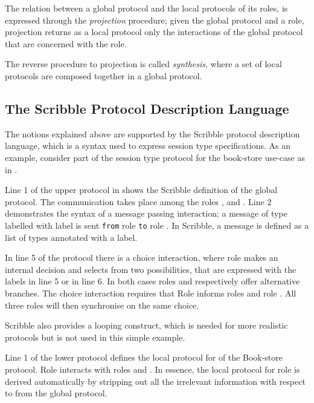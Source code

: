 The relation between a global protocol and the
local protocols of its roles, is expressed
through the {\em projection} procedure;
given the global protocol and a role, projection
returns as a local protocol only the
interactions of the global protocol that are concerned with
the role.

The reverse procedure to projection is called {\em synthesis},
where a set of local protocols are composed together in a global
protocol.


\subsection{The Scribble Protocol Description Language}
\label{sec:scribble}
The notions explained above are supported by the
Scribble protocol description language,
which is a syntax used to express session type specifications.
As an example,
consider part of the session type protocol for the book-store
use-case as in . 




Line 1 of the upper protocol in  shows the
Scribble definition of the global protocol. 
The communication takes place
among the roles \BuyerOne, \BuyerTwo and \Seller. Line 2 demonstrates
the syntax of a message passing interaction; a message
of type  labelled with label  is sent \lstinline|from|
role \BuyerOne \lstinline|to| role \Seller. In Scribble, a message is
defined as a list of types annotated with a label.

In line 5 of the protocol 
there is a choice interaction,
where role \BuyerTwo makes an internal decision and selects
from two possibilities, that are
expressed with the labels  in line 5 or  in line 6.
In  both cases roles \BuyerOne and \Seller respectively offer
alternative branches. The choice interaction requires that
Role \BuyerTwo informs roles \BuyerOne and role \Seller. All
three roles will then synchronise on the same choice.

Scribble also provides a looping construct, which is needed for more realistic protocols but is not used in this simple example.


Line 1 of the lower protocol defines the local protocol 
for \BuyerOne of the Book-store protocol. Role \BuyerOne
interacts with roles \BuyerTwo and \Seller. In essence,
the local protocol for role \BuyerOne is derived automatically
by stripping out all the irrelevant information with respect
to \BuyerOne from the global protocol.

